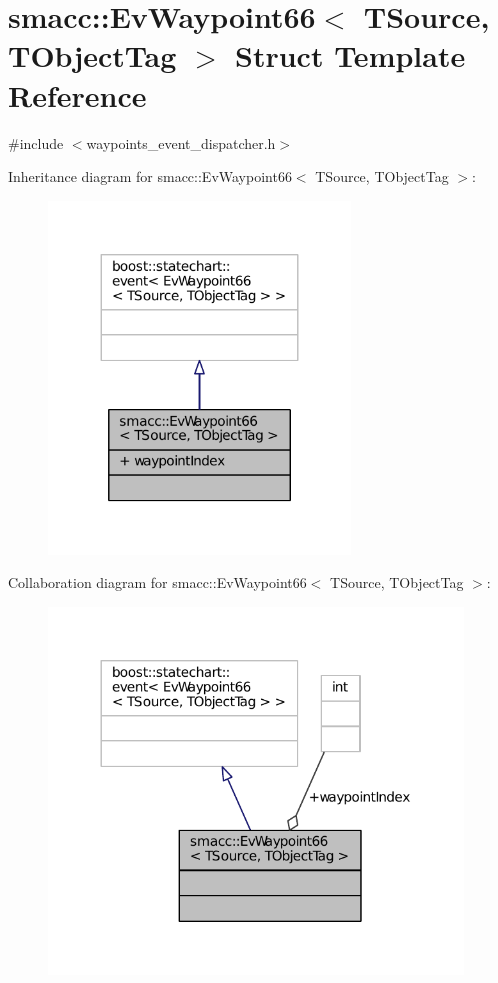 \hypertarget{structsmacc_1_1EvWaypoint66}{}\section{smacc\+:\+:Ev\+Waypoint66$<$ T\+Source, T\+Object\+Tag $>$ Struct Template Reference}
\label{structsmacc_1_1EvWaypoint66}


{\ttfamily \#include $<$waypoints\+\_\+event\+\_\+dispatcher.\+h$>$}



Inheritance diagram for smacc\+:\+:Ev\+Waypoint66$<$ T\+Source, T\+Object\+Tag $>$\+:
\nopagebreak
\begin{figure}[H]
\begin{center}
\leavevmode
\includegraphics[width=227pt]{structsmacc_1_1EvWaypoint66__inherit__graph}
\end{center}
\end{figure}


Collaboration diagram for smacc\+:\+:Ev\+Waypoint66$<$ T\+Source, T\+Object\+Tag $>$\+:
\nopagebreak
\begin{figure}[H]
\begin{center}
\leavevmode
\includegraphics[width=312pt]{structsmacc_1_1EvWaypoint66__coll__graph}
\end{center}
\end{figure}
